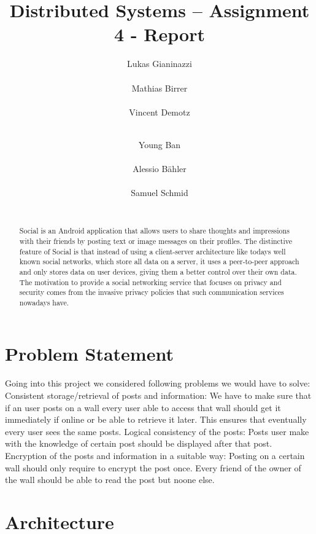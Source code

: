 \documentclass{report}
\title{Distributed Systems -- Assignment 4 - Report}
\author{
%
%
\alignauthor Lukas Gianinazzi\\
	\affaddr{ETH ID 11-719-143}\\
	\email{glukas@student.ethz.ch}
\alignauthor Mathias Birrer\\
	\affaddr{ETH ID 11-921-129}\\
	\email{matbirre@student.ethz.ch}
\alignauthor Vincent Demotz\\
	\affaddr{ETH ID XX-XXX-XXX}\\
	\email{vdemotz@student.ethz.ch}
\and  %
\alignauthor Young Ban\\
 	\affaddr{ETH ID 10-935-062}\\
 	\email{bany@student.ethz.ch}
\alignauthor Alessio Bähler\\
 	\affaddr{ETH ID XX-XXX-XXX}\\
 	\email{abaehler@student.ethz.ch}
\alignauthor Samuel Schmid\\
 	\affaddr{ETH ID 10-919-991}\\
 	\email{schmisam@student.ethz.ch}
}
\begin{document}
\maketitle

\begin{abstract}
Social is an Android application that allows users to share thoughts and impressions with their friends by posting text or image messages on their profiles.
The distinctive feature of Social is that instead of using a client-server architecture like todays well known social networks, which store all data on a server, it uses a peer-to-peer approach and only stores data on user devices, giving them a better control over their own data.
The motivation to provide a social networking service that focuses on privacy and security comes from the invasive privacy policies that such communication services nowadays have.
\end{abstract}

\section{Problem Statement}

Going into this project we considered following problems we would have to solve: \newline
Consistent storage/retrieval of posts and information:  \newline
We have to make sure that if an user posts on a wall every user able to access that wall should get it immediately if online or be able to retrieve it later. This ensures that eventually every user sees the same posts.  \newline
Logical consistency of the posts:  \newline
Posts user make with the knowledge of certain post should be displayed after that post.  \newline
Encryption of the posts and information in a suitable way:  \newline
Posting on a certain wall should only require to encrypt the post once. Every friend of the owner of the wall should be able to read the post but noone else. \newline


\section{Architecture}
\end{document}
